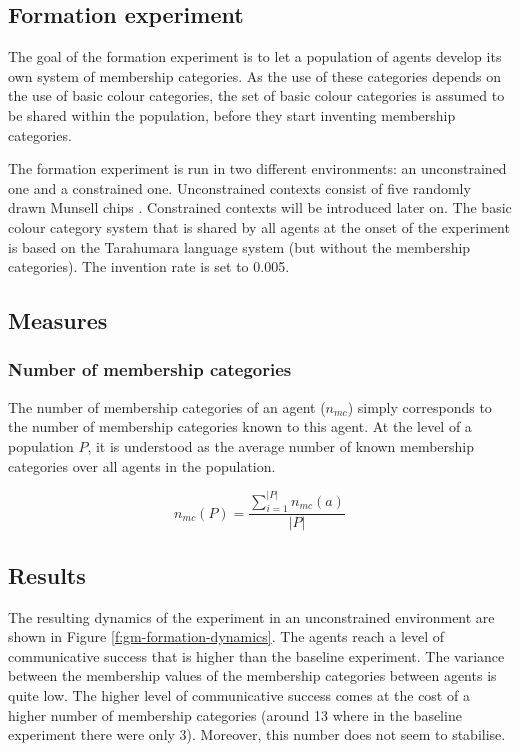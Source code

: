 \subsection{Formation experiment}

The goal of the formation experiment is to let a population of agents
develop its own system of membership categories. As the use of these
categories depends on the use of basic colour categories, the set
of basic colour categories is assumed to be shared within the
population, before they start inventing membership categories. 

The formation experiment is run in two different environments: an
unconstrained one and a constrained one. Unconstrained contexts consist of
five randomly drawn Munsell chips \citep{newhall42final}. Constrained
contexts will be introduced later on. The basic colour
category system that is shared by all agents at the onset of the
experiment is based on the Tarahumara language system (but without the
membership categories). The invention rate is set to 0.005.

\subsection{Measures}

\subsubsection{Number of membership categories}


The number of membership categories of an agent ($n_{mc}$) simply
corresponds to the number of membership categories known to this
agent. At the level of a population $P$, it is understood as the
average number of known membership categories over all agents in the
population.

\begin{equation}
n_{mc}(P) = \frac{\displaystyle \sum_{i=1}^{|P|} n_{mc}(a)}{|P|}
\label{eq:number-of-membership-categories-population}
\end{equation}

\subsection{Results}

The resulting dynamics of the experiment in an unconstrained
environment are shown in Figure \ref{f:gm-formation-dynamics}. The
agents reach a level of communicative success that is higher than the
baseline experiment. The variance between the membership values of the
membership categories between agents is quite low. The higher level of
communicative success comes at the cost of a higher number of
membership categories (around 13 where in the baseline experiment
there were only 3). Moreover, this number does not seem to stabilise.

